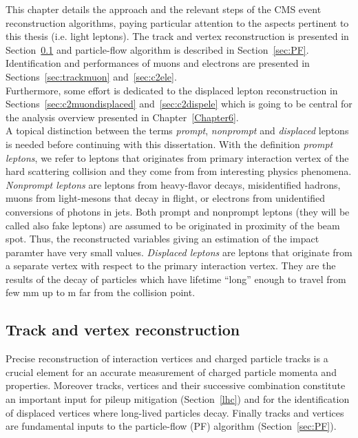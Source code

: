 \vspace{0.7cm}


This chapter details the approach and the relevant steps of the CMS
event reconstruction algorithms, paying particular attention to the
aspects pertinent to this thesis (i.e. light leptons). The track and vertex reconstruction 
is presented in Section~\ref{sec:trackvertex} and particle-flow
algorithm is described in Section~\ref{sec:PF}. Identification and
performances of muons and electrons are presented in
Sections~\ref{sec:trackmuon} and~\ref{sec:c2ele}.\\
Furthermore, some
effort is dedicated to the displaced lepton reconstruction in
Sections~\ref{sec:c2muondisplaced} and~\ref{sec:c2dispele} which is going to be central for the
analysis overview presented in Chapter~\ref{Chapter6}.\\

A topical distinction between the terms \emph{prompt}, \emph{nonprompt} and
\emph{displaced} leptons is needed before continuing with this
dissertation. With the definition \emph{prompt leptons}, we refer to
leptons that originates from primary
interaction vertex of the hard scattering collision and they come from
from interesting physics phenomena. \emph{Nonprompt leptons} are leptons from heavy-flavor decays, misidentified hadrons, muons from
light-mesons that decay in flight, or electrons from unidentified
conversions of  photons in jets. Both prompt and nonprompt leptons
(they will be called also fake leptons) are assumed to be originated
in proximity of  the beam
spot. Thus, the reconstructed variables giving an estimation of the
impact paramter have very small values. \emph{Displaced leptons} are
leptons that originate from a separate vertex with respect to
the primary interaction vertex. They are the results of the decay of 
particles which have lifetime ``long'' enough to travel from few mm up
to m far from the collision point.

\subsection{Track and vertex reconstruction}\label{sec:trackvertex}

Precise reconstruction of interaction vertices and charged
particle tracks is a crucial element for an accurate measurement of
charged particle momenta and properties. Moreover tracks, vertices and their
successive combination constitute an important input for pileup
mitigation (Section~\ref{lhc}) and for the
identification of displaced vertices where long-lived particles decay.
Finally tracks and vertices are fundamental inputs to the
particle-flow (PF) algorithm (Section~\ref{sec:PF}). \\

